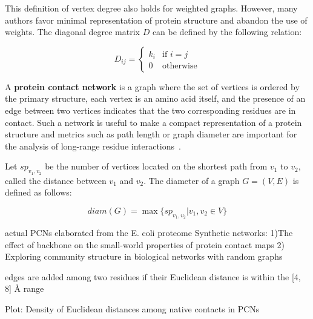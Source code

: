         This definition of vertex degree also holds for weighted graphs. However, many authors favor minimal representation of protein structure
        and abandon the use of weights. The diagonal degree matrix $D$ can be defined by the following relation:

        \begin{equation}    
            D_{ij} =
                \begin{cases}
                    k_i & \text{if } i = j \\
                    0 & \text{otherwise}
                \end{cases}       
        \end{equation}

        A \textbf{protein contact network} is a graph where the set of vertices is ordered by the primary structure, each vertex is an amino acid itself,
        and the presence of an edge between two vertices indicates that the two corresponding residues are in contact. Such a network is useful to make a compact 
        representation of a protein structure and metrics such as path length or graph diameter are important for the analysis of long-range residue
        interactions~\cite{doi:10.1021/cr3002356}.

        Let $sp_{v_1,v_2}$ be the number of vertices located on the shortest path from $v_1$ to $v_2$, called the distance between $v_1$ and $v_2$.
        The diameter of a graph $G = (V, E)$ is defined as follows:

        \begin{equation}
            diam(G) = \max \{ sp_{v_1, v_2} | v_1, v_2 \in V \}
        \end{equation}


        \cite{doi:10.1080/07391102.2015.1077736}
        actual PCNs elaborated from the E. coli proteome 
        Synthetic networks:
        1)The effect of backbone on the small-world properties of protein contact maps
        2) Exploring community structure in biological networks with random graphs

        edges are added among two residues if their Euclidean distance is within the [4, 8] \AA{} range

        Plot: Density of Euclidean distances among native contacts in PCNs
